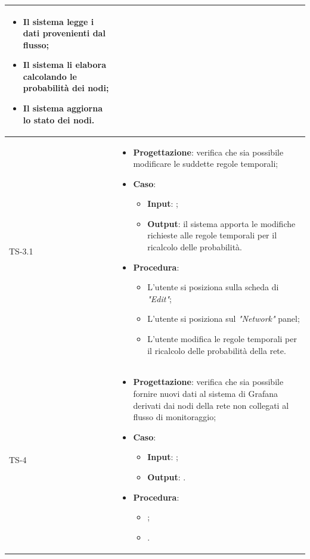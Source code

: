 \begin{longtable}{|C{2.5cm}|C{13cm}|}
\begin{itemize}
	\begin{itemize}
		\item Il sistema legge i dati provenienti dal flusso;
		\item Il sistema li elabora calcolando le probabilità dei nodi;
		\item Il sistema aggiorna lo stato dei nodi.
	\end{itemize} 
\end{itemize}	
	\\
	\hline
	{TS-3.1} & 
\begin{itemize}
	\item \textbf{Progettazione}: verifica che sia possibile modificare le
	suddette regole temporali;
	\item \textbf{Caso}: 
	\begin{itemize}
		\item \textbf{Input}: ;
		\item \textbf{Output}: il sistema apporta le modifiche richieste alle regole temporali per il ricalcolo delle probabilità.
	\end{itemize}
	\item \textbf{Procedura}:
	\begin{itemize}
		\item L'utente si posiziona sulla scheda di \emph{"Edit"};
		\item L'utente si posiziona sul \emph{"Network"} panel;
		\item L'utente modifica le regole temporali per il ricalcolo delle probabilità della rete.
	\end{itemize} 
\end{itemize}
\\
	\hline
	{TS-4} & 
\begin{itemize}
	\item \textbf{Progettazione}: verifica che sia possibile fornire nuovi dati
	al sistema di Grafana derivati dai nodi della rete non collegati al flusso di
	monitoraggio;
	\item \textbf{Caso}: 
	\begin{itemize}
		\item \textbf{Input}: ;
		\item \textbf{Output}: .
	\end{itemize}
	\item \textbf{Procedura}:
	\begin{itemize}
		\item ;
		\item .
	\end{itemize} 

\end{itemize}
\end{longtable}
